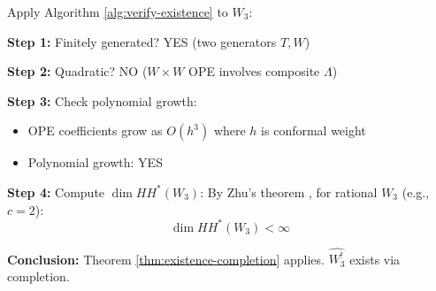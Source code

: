 \begin{example}[Verifying W₃]
Apply Algorithm \ref{alg:verify-existence} to $W_3$:

\textbf{Step 1:} Finitely generated? YES (two generators $T, W$)

\textbf{Step 2:} Quadratic? NO ($W \times W$ OPE involves composite $\Lambda$)

\textbf{Step 3:} Check polynomial growth:
\begin{itemize}
\item OPE coefficients grow as $O(h^3)$ where $h$ is conformal weight
\item Polynomial growth: YES
\end{itemize}

\textbf{Step 4:} Compute $\dim HH^*(W_3)$:
By Zhu's theorem \cite{Zhu96}, for rational $W_3$ (e.g., $c = 2$):
$$\dim HH^*(W_3) < \infty$$

\textbf{Conclusion:} Theorem \ref{thm:existence-completion} applies. $\widehat{W_3^!}$ exists via completion.
\end{example}

